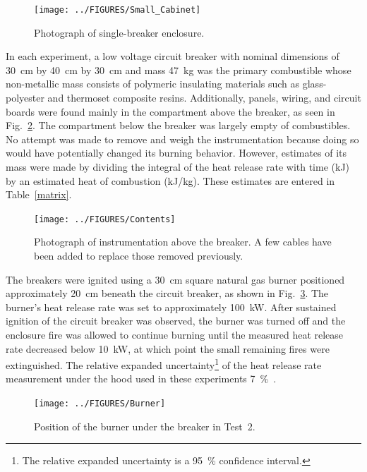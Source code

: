 \documentclass[12pt]{article}
\begin{document}
\begin{figure}[ht]
\centering
\texttt{[image: ../FIGURES/Small\_Cabinet]}
\caption[Photograph of single-breaker enclosure] {Photograph of single-breaker enclosure.}
\label{fig:Cabinet_2}
\end{figure}

In each experiment, a low voltage circuit breaker with nominal dimensions of 30~cm by 40~cm by 30~cm and mass 47~kg was the primary combustible whose non-metallic mass consists of polymeric insulating materials such as glass-polyester and thermoset composite resins. Additionally, panels, wiring, and circuit boards were found mainly in the compartment above the breaker, as seen in Fig.~\ref{fig:Contents}. The compartment below the breaker was largely empty of combustibles. No attempt was made to remove and weigh the instrumentation because doing so would have potentially changed its burning behavior. However, estimates of its mass were made by dividing the integral of the heat release rate with time (kJ) by an estimated heat of combustion (kJ/kg). These estimates are entered in Table~\ref{matrix}.

\begin{figure}[ht]
\centering
\texttt{[image: ../FIGURES/Contents]}
\caption[Photograph of instrumentation above the breaker] {Photograph of instrumentation above the breaker. A few cables have been added to replace those removed previously.}
\label{fig:Contents}
\end{figure}

The breakers were ignited using a 30~cm square natural gas burner positioned approximately 20~cm beneath the circuit breaker, as shown in Fig.~\ref{fig:Burner}. The burner's heat release rate was set to approximately 100~kW. After sustained ignition of the circuit breaker was observed, the burner was turned off and the enclosure fire was allowed to continue burning until the measured heat release rate decreased below 10~kW, at which point the small remaining fires were extinguished. The relative expanded uncertainty\footnote{The relative expanded uncertainty is a 95~\% confidence interval.} of the heat release rate measurement under the hood used in these experiments 7~\%~\cite{bryant2019nist}.

\begin{figure}[ht]
\centering
\texttt{[image: ../FIGURES/Burner]}
\caption[Position of the burner] {Position of the burner under the breaker in Test~2.}
\label{fig:Burner}
\end{figure}
\end{document}
